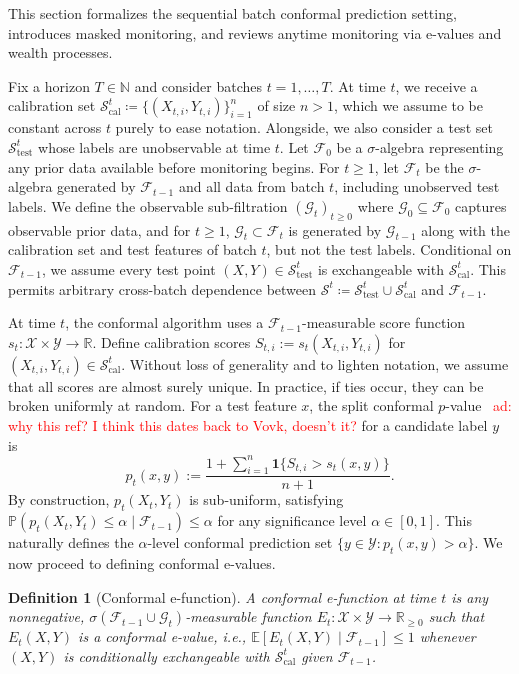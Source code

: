 \documentclass{uai2026} %
\newtheorem{definition}[theorem]{Definition}
\newcommand{\N}{\mathbb{N}}
\newcommand{\R}{\mathbb{R}}
\newcommand{\1}{\mathbf{1}}
\newcommand{\ind}[1]{\mathbf{1}\{#1\}}
\newcommand{\prob}{\mathbb{P}}
\newcommand{\expec}{\mathbb{E}}
\newcommand{\test}{\mathrm{test}}
\newcommand{\xcal}{\mathcal{X}}
\newcommand{\ycal}{\mathcal{Y}}
\newcommand{\scal}{\mathcal{S}}
\newcommand{\eqdef}{\coloneqq}
\newcommand{\F}{\mathcal{F}}
\newcommand{\G}{\mathcal{G}}
\newcommand{\fcal}{\F}
\newcommand{\cali}{\mathrm{cal}}
\newcommand{\scalcal}{\scal_{\cali}}
\newcommand{\scaltest}{\scal_{\test}}
\newcommand{\aymeric}[1]{\textcolor{red}{ad: #1}}
\begin{document}
This section formalizes the sequential batch conformal prediction setting, introduces masked monitoring, and reviews anytime monitoring via e-values and wealth processes.

Fix a horizon $T\in\N$ and consider batches $t=1,\dots,T$. At time $t$, we receive a calibration set $\scalcal^t \coloneqq \{(X_{t,i},Y_{t,i})\}_{i=1}^n$ of size $n>1$, which we assume to be constant across $t$ purely to ease notation. Alongside, we also consider a test set $\scaltest^t$ whose labels are unobservable at time $t$. Let $\F_0$ be a $\sigma$-algebra representing any prior data available before monitoring begins. For $t\ge 1$, let $\F_t$ be the $\sigma$-algebra generated by $\F_{t-1}$ and all data from batch $t$, including unobserved test labels. We define the observable sub-filtration $(\G_t)_{t\ge 0}$ where $\G_0 \subseteq \F_0$ captures observable prior data, and for $t \ge 1$, $\G_t \subset \F_t$ is generated by $\G_{t-1}$ along with the calibration set and test features of batch $t$, but not the test labels. Conditional on $\F_{t-1}$, we assume every test point $(X, Y) \in \scaltest^t$ is exchangeable with $\scalcal^t$. This permits arbitrary cross-batch dependence between $\scal^t \eqdef \scaltest^t \cup \scalcal^t$ and $\F_{t-1}$.

At time $t$, the conformal algorithm uses a $\fcal_{t-1}$-measurable score function $s_t:\xcal\times\ycal\to\R$. Define calibration scores $S_{t,i}:=s_t(X_{t,i},Y_{t,i})$ for $(X_{t,i},Y_{t,i})\in \scalcal^t$. Without loss of generality and to lighten notation, we assume that all scores are almost surely unique. In practice, if ties occur, they can be broken uniformly at random. For a test feature $x$, the split conformal $p$-value~\citep{papadopoulos2008inductive} \aymeric{why this ref? I think this dates back to Vovk, doesn't it?} for a candidate label $y$ is
\begin{equation}
  \label{eq:pt-def}
  p_t(x,y):=\frac{1+\sum_{i=1}^{n}\ind{S_{t,i}>s_t(x,y)}}{n+1}.
\end{equation}
By construction, $p_t(X_t, Y_t)$ is sub-uniform, satisfying $\prob(p_t(X_t, Y_t) \le \alpha \mid \F_{t-1}) \le \alpha$ for any significance level $\alpha \in [0,1]$. This naturally defines the $\alpha$-level conformal prediction set $\{y \in \ycal : p_t(x,y) > \alpha\}$. We now proceed to defining conformal e-values.

\begin{definition}[Conformal e-function]
  A conformal e-function at time $t$ is any nonnegative, $\sigma(\F_{t-1} \cup \G_t)$-measurable function $E_t:\xcal\times\ycal\to\R_{\ge 0}$ such that $E_t(X,Y)$ is a conformal e-value, i.e.,  $\expec[E_t(X,Y) \mid \F_{t-1}] \le 1$ whenever $(X,Y)$ is conditionally exchangeable with $\scalcal^t$ given $\F_{t-1}$.
\end{definition}
\end{document}
